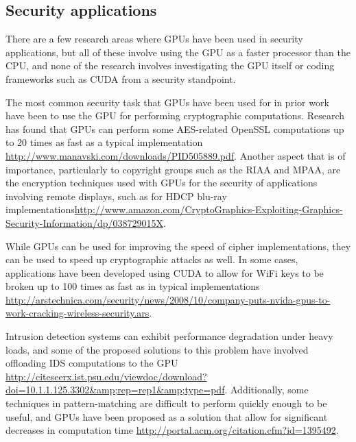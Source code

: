 \documentclass[letterpaper,10pt]{article}
\begin{document}
\begin{multicols}{2}
\subsection{Security applications}
  There are a few research areas where GPUs have been used in security applications, but all of these involve using the GPU as a faster processor than the CPU, and none of the research involves investigating the GPU itself or coding frameworks such as CUDA from a security standpoint.
  
  The most common security task that GPUs have been used for in prior work have been to use the GPU for performing cryptographic computations. Research has found that GPUs can perform some AES-related OpenSSL computations up to 20 times as fast as a typical implementation
\url{http://www.manavski.com/downloads/PID505889.pdf}. Another aspect that is of importance, particularly to copyright groups such as the RIAA and MPAA, are the encryption techniques used with GPUs for the security of applications involving remote displays, such as for HDCP blu-ray implementations\url{http://www.amazon.com/CryptoGraphics-Exploiting-Graphics-Security-Information/dp/038729015X}.
  
  While GPUs can be used for improving the speed of cipher implementations, they can be used to speed up cryptographic attacks as well. In some cases, applications have been developed using CUDA to allow for WiFi keys to be broken up to 100 times as fast as in typical implementations \url{http://arstechnica.com/security/news/2008/10/company-puts-nvida-gpus-to-work-cracking-wireless-security.ars}.
  
  Intrusion detection systems can exhibit performance degradation under heavy
  loads, and some of the proposed solutions to this problem have involved
  offloading IDS computations to the GPU
  \url{http://citeseerx.ist.psu.edu/viewdoc/download?doi=10.1.1.125.3302&amp;rep=rep1&amp;type=pdf}.
  Additionally, some techniques in pattern-matching are difficult to perform
  quickly enough to be useful, and GPUs have been proposed as a solution that
  allow for significant decreases in computation time
  \url{http://portal.acm.org/citation.cfm?id=1395492}.



\end{multicols}
\end{document}
